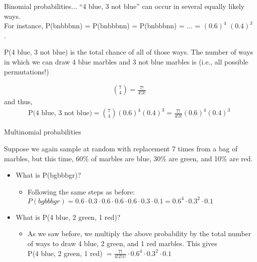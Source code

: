 \documentclass[aspectratio=169]{../latex_main/tntbeamer}  %
\begin{document}
	
		\begin{frame}{Binomial probabilities...}
	“4 blue, 3 not blue” can occur in several equally likely ways.\\                     For instance, P(bnbbbnn) = P(bnbbbnn) = P(bnbbbnn) = ... = $(0.6)^4$ $(0.4)^3$. \\         \bigskip
	    
	    P(4 blue, 3 not blue) is the total chance of all of those ways. The number of ways in which we can draw 4 blue marbles and 3 not blue marbles is (i.e., all possible permutations!)

        \begin{align*}
            \binom{7}{4} = \frac{7!}{4!3!}
        \end{align*}
    and thus,
    \begin{align*}
        \text{P(4 blue, 3 not blue)} = \binom{7}{4}(0.6)^4 (0.4)^3 = \frac{7!}{4!3!}(0.6)^4 (0.4)^3
    \end{align*}

	\end{frame}

\begin{frame}{Multinomial probabilities}

Suppose we again sample at random with replacement 7 times from a bag of
marbles, but this time, 60\% of marbles are blue, 30\% are green, and 10\% are red.

\begin{itemize}
    \item What is P(bgbbbgr)?
    \begin{itemize}
        \item Following the same steps as before:\\
        $ P(bgbbbgr) = 0.6 \cdot 0.3 \cdot 0.6 \cdot 0.6 \cdot 0.6 \cdot 0.3 \cdot 0.1 = 0.6^4 \cdot 0.3^2 \cdot 0.1$
    \end{itemize}
    \item What is P(4 blue, 2 green, 1 red)?
    \begin{itemize}
        \item As we saw before, we multiply the above probability by the total number of ways to draw 4 blue, 2 green, and 1 red marbles. This gives\\
P(4 blue, 2 green, 1 red) $= \frac{7!}{4!2!1!} \cdot  0.6^4 \cdot 0.3^2 \cdot 0.1$
    \end{itemize}
\end{itemize}
    
\end{frame}
\end{document}
